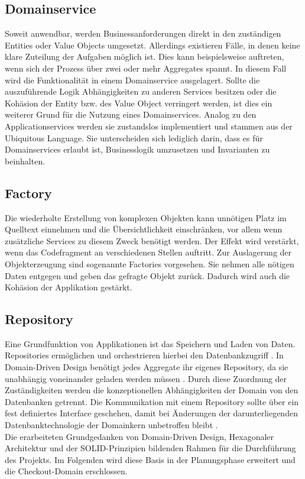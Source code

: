 \subsection{Domainservice}

Soweit anwendbar, werden Businessanforderungen direkt in den zuständigen Entities oder Value Objects umgesetzt. Allerdings existieren Fälle, in denen keine klare Zuteilung der Aufgaben möglich ist. Dies kann beispielsweise auftreten, wenn sich der Prozess über zwei oder mehr Aggregates spannt. In diesem Fall wird die Funktionalität in einem Domainservice ausgelagert. Sollte die auszuführende Logik Abhängigkeiten zu anderen Services besitzen oder die Kohäsion der Entity bzw. des Value Object verringert werden, ist dies ein weiterer Grund für die Nutzung eines Domainservices. Analog zu den Applicationservices werden sie zustandslos implementiert und stammen aus der Ubiquitous Language. Sie unterscheiden sich lediglich darin, dass es für Domainservices erlaubt ist, Businesslogik umzusetzen und Invarianten zu beinhalten. \cite[S. 268]{Vernon.2015}

\subsection{Factory}

Die wiederholte Erstellung von komplexen Objekten kann unnötigen Platz im Quelltext einnehmen und die Übersichtlichkeit einschränken, vor allem wenn zusätzliche Services zu diesem Zweck benötigt werden. Der Effekt wird verstärkt, wenn das Codefragment an verschiedenen Stellen auftritt. Zur Auslagerung der Objekterzeugung sind sogenannte Factories vorgesehen. Sie nehmen alle nötigen Daten entgegen und geben das gefragte Objekt zurück. Dadurch wird auch die Kohäsion der Applikation gestärkt. \cite[S. 137f.]{Evans.2011}

\subsection{Repository}

Eine Grundfunktion von Applikationen ist das Speichern und Laden von Daten. Repositories ermöglichen und orchestrieren hierbei den Datenbankzugriff \cite[S. 151]{Evans.2011}. In Domain-Driven Design benötigt jedes Aggregate ihr eigenes Repository, da sie unabhängig voneinander geladen werden müssen \cite[S. 401]{Vernon.2015}. Durch diese Zuordnung der Zuständigkeiten werden die konzeptionellen Abhängigkeiten der Domain von den Datenbanken getrennt. Die Kommunikation mit einem Repository sollte über ein fest definiertes Interface geschehen, damit bei Änderungen der darunterliegenden Datenbanktechnologie der Domainkern unbetroffen bleibt \cite[S. 152]{Evans.2011}. \\

Die erarbeiteten Grundgedanken von Domain-Driven Design, Hexagonaler Architektur und der SOLID-Prinzipien bildenden Rahmen für die Durchführung des Projekts. Im Folgenden wird diese Basis in der Planungsphase erweitert und die Checkout-Domain erschlossen.
